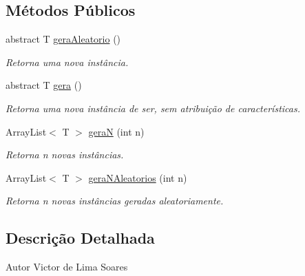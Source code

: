 \subsection*{Métodos Públicos}
\begin{DoxyCompactItemize}
\item 
abstract T \hyperlink{classic_1_1populacional_1_1algoritmo_1_1operadores_1_1_gerador_3_01_t_01extends_01_ser_01_4_af4da005d5efc0435aa204118b00afe80}{gera\-Aleatorio} ()
\begin{DoxyCompactList}\small\item\em Retorna uma nova instância. \end{DoxyCompactList}\item 
abstract T \hyperlink{classic_1_1populacional_1_1algoritmo_1_1operadores_1_1_gerador_3_01_t_01extends_01_ser_01_4_afa90423ad3e11f2795583c2bc91b163b}{gera} ()
\begin{DoxyCompactList}\small\item\em Retorna uma nova instância de ser, sem atribuição de características. \end{DoxyCompactList}\item 
Array\-List$<$ T $>$ \hyperlink{classic_1_1populacional_1_1algoritmo_1_1operadores_1_1_gerador_3_01_t_01extends_01_ser_01_4_aaec94d77b3c8b040639d2d138e0d0d86}{gera\-N} (int n)
\begin{DoxyCompactList}\small\item\em Retorna n novas instâncias. \end{DoxyCompactList}\item 
Array\-List$<$ T $>$ \hyperlink{classic_1_1populacional_1_1algoritmo_1_1operadores_1_1_gerador_3_01_t_01extends_01_ser_01_4_a3dc5afd018e47d5036123df91a542c4d}{gera\-N\-Aleatorios} (int n)
\begin{DoxyCompactList}\small\item\em Retorna n novas instâncias geradas aleatoriamente. \end{DoxyCompactList}\end{DoxyCompactItemize}


\subsection{Descrição Detalhada}
\begin{DoxyAuthor}{Autor}
Victor de Lima Soares 
\end{DoxyAuthor}


